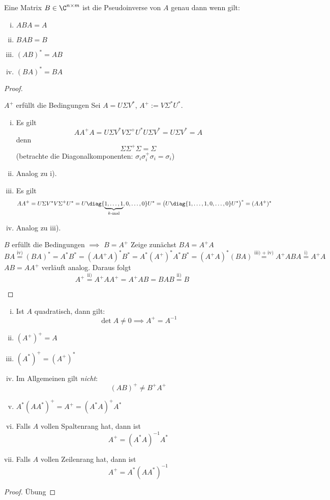 \documentclass[a4paper,11pt]{scrartcl}
\begin{document}
\begin{st}
	\label{1.40}
	Eine Matrix $B\in \C^{n\times m}$ ist die Pseudoinverse von $A$ genau dann wenn gilt:
	\begin{enumerate}[i)]
		\item
			$ABA = A$
		\item
			$BAB = B$
		\item
			$(AB)^* = AB$
		\item
			$(BA)^* = BA$
	\end{enumerate}
	\begin{proof}
		\begin{seg}{$A^+$ erfüllt die Bedingungen}
			Sei $A=U\Sigma V^*$, $A^+ := V\Sigma^*U^*$.
			\begin{enumerate}[i)]
				\item
					Es gilt
					\[
						AA^+A = U\Sigma V^* V \Sigma^+ U^* U \Sigma V^* = U\Sigma V^* = A
					\]
					denn
					\[
						\Sigma \Sigma^+ \Sigma = \Sigma
					\]
					(betrachte die Diagonalkomponenten: $\sigma_i \sigma_i^+ \sigma_i = \sigma_i$)
				\item
					Analog zu i).
				\item
					Es gilt
					\[
						AA^+ = U \Sigma V^* V \Sigma^+ U^* = U \diag\{\underbrace{1,\dotsc,1}_{k\text{-mal}},0,\dotsc, 0\} U^* = \big(U \diag\{1,\dotsc,1,0,\dotsc,0\} U^*\big)^* = (AA^+)^*
					\]
				\item
					Analog zu iii).
			\end{enumerate}
		\end{seg}
		\begin{seg}{$B$ erfüllt die Bedingungen $\implies$ $B=A^+$}
			Zeige zunächst $BA=A^+A$
			\[
				BA \stackrel{\text{iv)}}= (BA)^* = A^*B^* = (AA^+A)^*B^* = A^*(A^+)^*A^*B^* = (A^+A)^*(BA) \stackrel{\text{iii) + iv)}}= A^+ABA \stackrel{\text{i)}} = A^+A
			\]
			$AB=AA^+$ verläuft analog.
			Daraus folgt
			\[
				A^+ \stackrel{\text{ii)}}= A^+AA^+ = A^+AB = BAB \stackrel{\text{ii)}}= B 
			\]
		\end{seg}
	\end{proof}
\end{st}

\begin{st}[Eigenschaften]
	\label{1.41}
	\begin{enumerate}[i)]
		\item
			Ist $A$ quadratisch, dann gilt:
			\[
				\det A \neq 0 \implies A^+ = A^{-1}
			\]
		\item
			$(A^+)^+ = A$
		\item
			$(A^*)^+ = (A^+)^*$
		\item
			Im Allgemeinen gilt \emph{nicht}:
			\[
				(AB)^+ \neq B^+A^+
			\]
		\item
			$A^*(AA^*)^+ = A^+ = (A^*A)^+ A^*$
		\item
			Falls $A$ vollen Spaltenrang hat, dann ist
			\[
				A^+ = (A^*A)^{-1}A^*
			\]
		\item
			Falls $A$ vollen Zeilenrang hat, dann ist
			\[
				A^+ = A^*(AA^*)^{-1}
			\]
	\end{enumerate}
	\begin{proof}
		Übung
	\end{proof}
\end{st}
\end{document}
